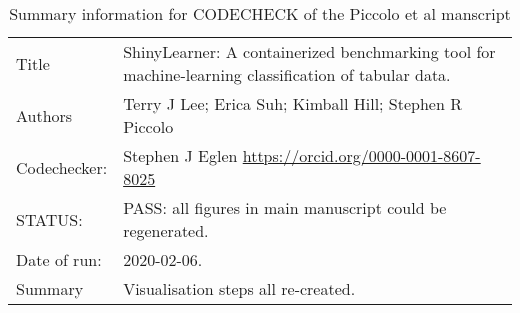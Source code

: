 \begin{table}[h!]
  \centering
  \begin{tabular}{lp{12cm}}
    \toprule
    Title & ShinyLearner: A containerized benchmarking tool for machine-learning classification of tabular data.\\
    Authors & Terry J Lee; Erica Suh; Kimball Hill; Stephen R Piccolo\\
    Codechecker: & Stephen J Eglen   \url{https://orcid.org/0000-0001-8607-8025}
    \\
    STATUS:  & PASS: all figures in main manuscript could be regenerated.\\
    Date of run: & 2020-02-06.\\
    Summary & Visualisation steps all re-created.\\
              \bottomrule
  \end{tabular}
  \caption{Summary information for CODECHECK of the Piccolo et al
    manscript}
  \label{tab:summary}
\end{table}